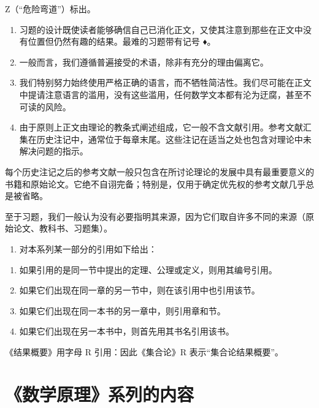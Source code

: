 Z（“危险弯道”）标出。

\begin{enumerate}
\def\labelenumi{\arabic{enumi}.}
\setcounter{enumi}{6}
\item
  习题的设计既使读者能够确信自己已消化正文，又使其注意到那些在正文中没有位置但仍然有趣的结果。最难的习题带有记号 ♦。
\item
  一般而言，我们遵循普遍接受的术语，除非有充分的理由偏离它。
\item
  我们特别努力始终使用严格正确的语言，而不牺牲简洁性。我们尽可能在正文中提请注意语言的滥用，没有这些滥用，任何数学文本都有沦为迂腐，甚至不可读的风险。
\item
  由于原则上正文由理论的教条式阐述组成，它一般不含文献引用。参考文献汇集在历史注记中，通常位于每章末尾。这些注记在适当之处也包含对理论中未解决问题的指示。
\end{enumerate}

每个历史注记之后的参考文献一般只包含在所讨论理论的发展中具有最重要意义的书籍和原始论文。它绝不自诩完备；特别是，仅用于确定优先权的参考文献几乎总是被省略。

至于习题，我们一般认为没有必要指明其来源，因为它们取自许多不同的来源（原始论文、教科书、习题集）。

\begin{enumerate}
\def\labelenumi{\arabic{enumi}.}
\setcounter{enumi}{10}
\tightlist
\item
  对本系列某一部分的引用如下给出：
\end{enumerate}

\begin{enumerate}
\def\labelenumi{\alph{enumi})}
\item
  如果引用的是同一节中提出的定理、公理或定义，则用其编号引用。
\item
  如果它们出现在同一章的另一节中，则在该引用中也引用该节。
\item
  如果它们出现在同一本书的另一章中，则引用章和节。
\item
  如果它们出现在另一本书中，则首先用其书名引用该书。
\end{enumerate}

《结果概要》用字母 R 引用：因此《集合论》R 表示“集合论结果概要”。

\chapter*{《数学原理》系列的内容}
{}


